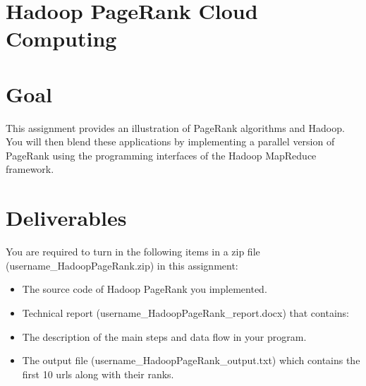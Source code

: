  
 
\lstset{style=mystyle}


\section{Hadoop PageRank Cloud Computing}
\section*{Goal}
 
This assignment provides an illustration of PageRank algorithms and Hadoop. You
will then blend these applications by implementing a parallel version of
PageRank using the programming interfaces of the Hadoop MapReduce framework. 


\section*{Deliverables}
You are required to turn in the following items in a zip file
(username\_HadoopPageRank.zip) in this assignment: 

\begin{itemize}
\item The source code of Hadoop PageRank you implemented.
\item Technical report (username\_HadoopPageRank\_report.docx) that contains: 
\item The description of the main steps and data flow in your program. 
\item The output file (username\_HadoopPageRank\_output.txt) which contains the
  first 10 urls along with their ranks. 

\end{itemize}

